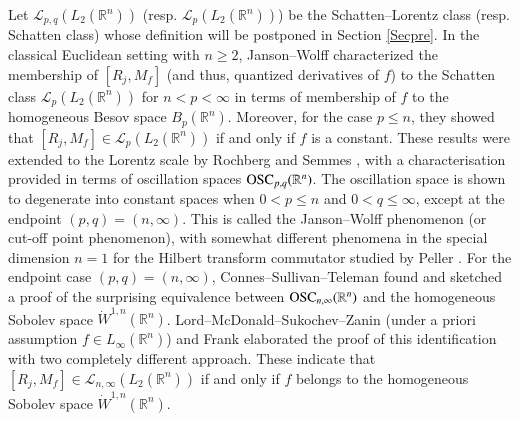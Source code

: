 \documentclass[12pt]{amsart}
\begin{document}

Let $\mathcal{L}_{p,q}(L_2(\mathbb{R}^{n}))$ (resp. $\mathcal{L}_{p}(L_2(\mathbb{R}^{n}))$) be the Schatten--Lorentz class (resp. Schatten class) whose definition will be postponed in Section \ref{Secpre}. In the classical Euclidean setting with $n\geq 2$, Janson--Wolff characterized the membership of $[R_j,M_f]$ (and thus, quantized derivatives of $f$) to the Schatten class $\mathcal{L}_p(L_2(\mathbb{R}^{n}))$ for $n<p<\infty$ in terms of membership of $f$ to the homogeneous Besov space $B_p(\mathbb{R}^n)$. Moreover, for the case $p\leq n$, they showed that $[R_j,M_f]\in \mathcal{L}_p(L_2(\mathbb{R}^{n}))$ if and only if $f$ is a constant. These results were extended to the Lorentz scale by Rochberg and Semmes \cite{RS}, with a characterisation provided in terms of oscillation spaces ${\rm OSC}_{p,q}(\mathbb{R}^n)$. The oscillation space is shown to degenerate into constant spaces when $0<p\leq n$ and $0<q\leq \infty$, except at the endpoint $(p,q)=(n,\infty)$. This is called the Janson--Wolff phenomenon (or cut-off point phenomenon), with somewhat different phenomena in the special dimension $n=1$ for the Hilbert transform commutator studied by Peller \cite{P,P2}. For the endpoint case $(p,q)=(n,\infty)$, Connes--Sullivan--Teleman \cite{CST} found and sketched a proof of the surprising equivalence between ${\rm OSC}_{n,\infty}(\mathbb{R}^n)$ and the homogeneous Sobolev space $\dot{W}^{1,n}(\mathbb{R}^{n})$. Lord--McDonald--Sukochev--Zanin \cite{LMSZ} (under a priori assumption $f\in L_\infty(\mathbb{R}^n)$) and Frank \cite{MR4716964} elaborated the proof of this identification with two completely different approach. These indicate that $[R_j,M_f]\in \mathcal{L}_{n,\infty}(L_2(\mathbb{R}^{n}))$ if and only if $f$ belongs to the homogeneous Sobolev space $\dot{W}^{1,n}(\mathbb{R}^{n})$.
\end{document}
